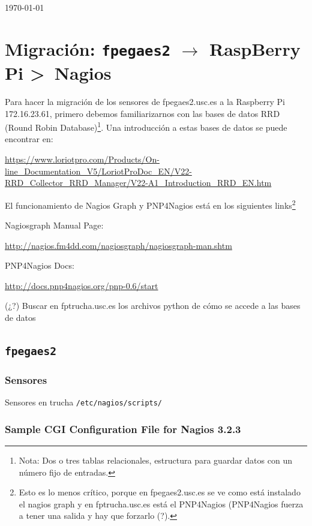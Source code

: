 \documentclass[a4paper]{book}
\begin{document}
\begin{titlepage}
	\vfill


	{\large \today\par}
\end{titlepage}


\tableofcontents


\chapter{Migración: \texttt{fpegaes2} $\rightarrow$ RaspBerry Pi \textgreater\ Nagios}

Para hacer la migración de los sensores de fpegaes2.usc.es a la Raspberry Pi 172.16.23.61, primero debemos familiarizarnos con las bases de datos RRD (Round Robin Database)\footnote{Nota: Dos o tres tablas relacionales, estructura para guardar datos con un número fijo de entradas.}. Una introducción a estas bases de datos se puede encontrar en:

\url{https://www.loriotpro.com/Products/On-line_Documentation_V5/LoriotProDoc_EN/V22-RRD_Collector_RRD_Manager/V22-A1_Introduction_RRD_EN.htm}

El funcionamiento de Nagios Graph y PNP4Nagios está en los siguientes links\footnote{Esto es lo menos crítico, porque en fpegaes2.usc.es se ve como está instalado el nagios graph y en fptrucha.usc.es está el PNP4Nagios (PNP4Nagios fuerza a tener una salida y hay que forzarlo (?).}

Nagiosgraph Manual Page:

\url{http://nagios.fm4dd.com/nagiosgraph/nagiosgraph-man.shtm}

PNP4Nagios Docs:

\url{http://docs.pnp4nagios.org/pnp-0.6/start}

(¿?) Buscar en fptrucha.usc.es los archivos python de cómo se accede a las bases de datos


\section{\texttt{fpegaes2}}

\subsection{Sensores}
Sensores en trucha \texttt{/etc/nagios/scripts/}

\subsection{Sample CGI Configuration File for Nagios 3.2.3}
\end{document}
